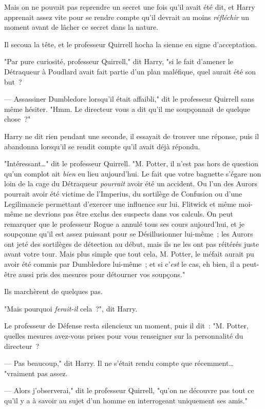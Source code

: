 Mais on ne pouvait pas reprendre un secret une fois qu'il avait été dit, et Harry apprenait assez vite pour se rendre compte qu'il devrait au moins \emph{réfléchir} un moment avant de lâcher ce secret dans la nature.

Il secoua la tête, et le professeur Quirrell hocha la sienne en signe d'acceptation.

"Par pure curiosité, professeur Quirrell," dit Harry, "si le fait d'amener le Détraqueur à Poudlard avait fait partie d'un plan maléfique, quel aurait été son but~?

--- Assassiner Dumbledore lorsqu'il était affaibli," dit le professeur Quirrell sans même hésiter. "Hmm. Le directeur vous a dit qu'il me soupçonnait de quelque chose~?"

Harry ne dit rien pendant une seconde, il essayait de trouver une réponse, puis il abandonna lorsqu'il se rendit compte qu'il avait déjà répondu.

"Intéressant…" dit le professeur Quirrell. "M. Potter, il n'est pas hors de question qu'un complot ait \emph{bien} eu lieu aujourd'hui. Le fait que votre baguette s'égare non loin de la cage du Détraqueur \emph{pourrait} avoir été un accident. Ou l'un des Aurors pourrait avoir été victime de l'Imperius, du sortilège de Confusion ou d'une Legilimancie permettant d'exercer une influence sur lui. Flitwick et même moi-même ne devrions pas être exclus des suspects dans vos calculs. On peut remarquer que le professeur Rogue a annulé tous ses cours aujourd'hui, et je soupçonne qu'il est assez puissant pour se Désillusionner lui-même~; les Aurors ont jeté des sortilèges de détection au début, mais ils ne les ont pas réitérés juste avant votre tour. Mais plus simple que tout cela, M. Potter, le méfait aurait pu avoir été commis par Dumbledore lui-même~; et si c'\emph{est} le cas, eh bien, il a peut-être aussi pris des mesures pour détourner vos soupçons."

Ils marchèrent de quelques pas.

"Mais pourquoi \emph{ferait-il} cela~?", dit Harry.

Le professeur de Défense resta silencieux un moment, puis il dit~: "M. Potter, quelles mesures avez-vous prises pour vous renseigner sur la personnalité du directeur~?

--- Pas beaucoup," dit Harry. Il ne s'était rendu compte que récemment… "vraiment pas assez.

--- Alors j'observerai," dit le professeur Quirrell, "qu'on ne découvre pas tout ce qu'il y a à savoir au sujet d'un homme en interrogeant uniquement ses amis."

